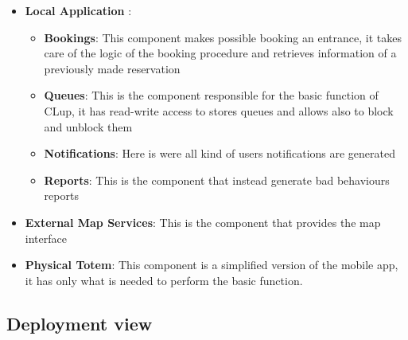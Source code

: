 \begin{itemize}
	\item \textbf{Local Application }:
	\begin{itemize}
		\item \textbf{Bookings}: This component makes possible booking an entrance, it takes care of the logic of the booking procedure and retrieves information of a previously made reservation
		\item \textbf{Queues}: This is the component responsible for the basic function of CLup, it has read-write access to stores queues and allows also to block and unblock them
		\item \textbf{Notifications}: Here is were all kind of users notifications are generated
		\item \textbf{Reports}: This is the component that instead generate bad behaviours reports
	\end{itemize}
	\item \textbf{External Map Services}: This is the component that provides the map interface
	\item \textbf{Physical Totem}: This component is a simplified version of the mobile app, it has only what is needed to perform the basic function.
\end{itemize}

\subsection{Deployment view}
